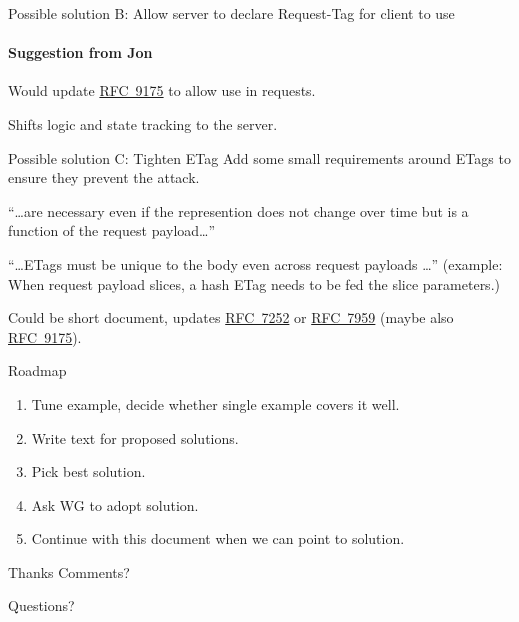 \documentclass[aspectratio=169,colorlinks]{beamer}
\newcommand{\rfc}[1]{\href{https://datatracker.ietf.org/doc/html/rfc#1}{RFC~#1}}
\begin{document}
\begin{frame}{Possible solution B: Allow server to declare Request-Tag for client to use}\large
	\framesubtitle{Suggestion from Jon}

	Would update \rfc{9175} to allow use in requests.

	Shifts logic and state tracking to the server.
\end{frame}

\begin{frame}{Possible solution C: Tighten ETag}\large
	Add some small requirements around ETags
	to ensure they prevent the attack.

	\bigskip

	``\ldots are necessary even if the represention does not change over time but is a function of the request payload\ldots''

	``\ldots ETags must be unique to the body even across request payloads \ldots''
	(example: When request payload slices, a hash ETag needs to be fed the slice parameters.)

	\bigskip

	Could be short document, updates \rfc{7252} or \rfc{7959} (maybe also \rfc{9175}).
\end{frame}

\begin{frame}{Roadmap}\Large
	\begin{enumerate}
		\item Tune example, decide whether single example covers it well.
		\item Write text for proposed solutions.
		\item Pick best solution.
		\item Ask WG to adopt solution.
		\item Continue with this document when we can point to solution.
	\end{enumerate}
\end{frame}

\begin{frame}{Thanks}\Large
	Comments?

	\bigskip

	Questions?
\end{frame}
\end{document}
